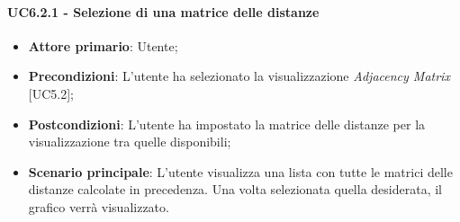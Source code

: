\paragraph{UC6.2.1 - Selezione di una matrice delle distanze}
\begin{itemize}
	\item \textbf{Attore primario}: Utente;
	\item \textbf{Precondizioni}: L'utente ha selezionato la visualizzazione \textit{Adjacency Matrix} [UC5.2];
	\item \textbf{Postcondizioni}: L'utente ha impostato la matrice delle distanze per la visualizzazione tra quelle disponibili;
	
	\item \textbf{Scenario principale}: L'utente visualizza una lista con tutte le matrici delle distanze calcolate in precedenza. Una volta selezionata quella desiderata, il grafico verrà visualizzato.
\end{itemize}